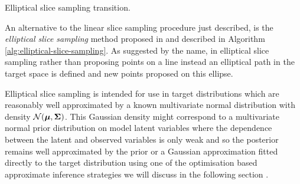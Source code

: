 \begin{algorithm}[!t]
\caption{Elliptical slice sampling transition.}
\label{alg:elliptical-slice-sampling}

\end{algorithm}

An alternative to the linear slice sampling procedure just described, is the \emph{elliptical slice sampling} method proposed in \citep{murray2010elliptical} and described in Algorithm \ref{alg:elliptical-slice-sampling}. As suggested by the name, in elliptical slice sampling rather than proposing points on a line instead an elliptical path in the target space is defined and new points proposed on this ellipse. 

Elliptical slice sampling is intended for use in target distributions which are reasonably well approximated by a known multivariate normal distribution with density $\nrm{\vct{\mu},\mtx{\Sigma}}$. This Gaussian density might correspond to a multivariate normal prior distribution on model latent variables where the dependence between the latent and observed variables is only weak and so the posterior remains well approximated by the prior or a Gaussian approximation fitted directly to the target distribution using one of the optimisation based approximate inference strategies we will discuss in the following section \citep{nishihara2014parallel}. 

